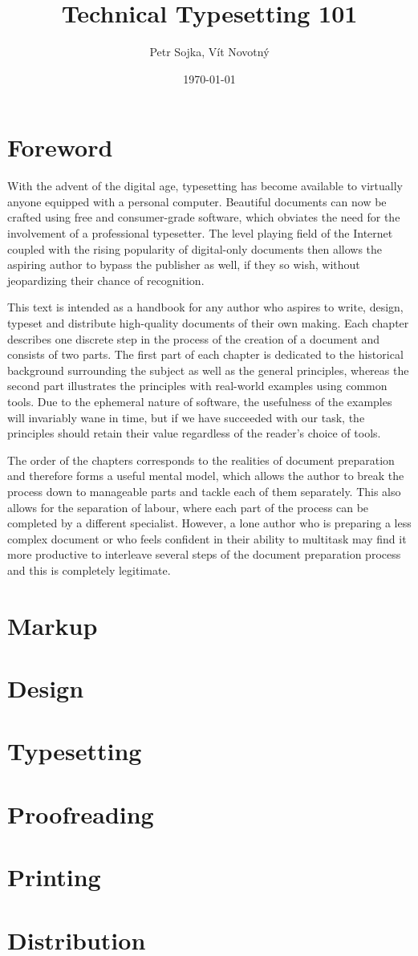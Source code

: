 \documentclass{book}
\title{Technical Typesetting 101}
\author{Petr Sojka, Vít Novotný}
\date{\today}
\begin{document}
  \frontmatter
    \maketitle
    \tableofcontents
  \mainmatter
    \chapter{Foreword}
      With the advent of the digital age, typesetting has become available to
      virtually anyone equipped with a personal computer. Beautiful documents
      can now be crafted using free and consumer-grade software, which obviates
      the need for the involvement of a professional typesetter. The level
      playing field of the Internet coupled with the rising popularity of
      digital-only documents then allows the aspiring author to bypass the
      publisher as well, if they so wish, without jeopardizing their chance of
      recognition.
      
      This text is intended as a handbook for any author who aspires to write,
      design, typeset and distribute high-quality documents of their own making.
      Each chapter describes one discrete step in the process of the creation of
      a document and consists of two parts. The first part of each chapter is
      dedicated to the historical background surrounding the subject as well as
      the general principles, whereas the second part illustrates the principles
      with real-world examples using common tools. Due to the ephemeral nature
      of software, the usefulness of the examples will invariably wane in time,
      but if we have succeeded with our task, the principles should retain their
      value regardless of the reader's choice of tools.

      The order of the chapters corresponds to the realities of document
      preparation and therefore forms a useful mental model, which allows the
      author to break the process down to manageable parts and tackle each of
      them separately. This also allows for the separation of labour, where
      each part of the process can be completed by a different specialist.
      However, a lone author who is preparing a less complex document or who
      feels confident in their ability to multitask may find it more productive
      to interleave several steps of the document preparation process and this
      is completely legitimate.

    \chapter{Markup}
    \chapter{Design}
    \chapter{Typesetting}
    \chapter{Proofreading}
    \chapter{Printing}
    \chapter{Distribution}
\end{document}
